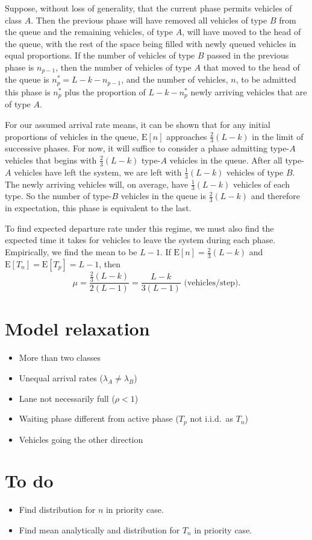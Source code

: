 \documentclass{amsart}
\begin{document}
Suppose, without loss of generality, that the current phase permits vehicles of
class $A$. Then the previous phase will have removed all vehicles of type $B$
from the queue and the remaining vehicles, of type $A$, will have moved to the
head of the queue, with the rest of the space being filled with newly queued
vehicles in equal proportions.
If the number of vehicles of type $B$ passed in the previous phase is $n_{p-1}$, then the number
of vehicles of type $A$ that moved to the head of the queue is
$n_p^*=L-k-n_{p-1}$,
and the number of vehicles, $n$, to be admitted this phase is $n_p^*$ plus the
proportion of $L -k-n_p^*$ newly arriving vehicles that are of type $A$.

For our assumed arrival rate means, it can be shown that for any initial
proportions of vehicles in the queue, $\text{E}[n]$ approaches
$\frac{2}{3}(L-k)$ in the limit of successive phases.
For now, it will suffice to consider a phase admitting type-$A$ vehicles that begins with
$\frac{2}{3}(L-k)$ type-$A$ vehicles in the queue.
After all type-$A$ vehicles have left the system, we are left with $\frac{1}{3}(L-k)$
vehicles of type $B$.
The newly arriving vehicles will, on average, have $\frac{1}{3}(L-k)$ vehicles of each type.
So the number of type-$B$ vehicles in the queue is $\frac{2}{3}(L-k)$ and
therefore in expectation, this phase is
equivalent to the last.

To find expected departure rate under this regime, we must also find the expected time it takes
for vehicles to leave the system during each phase.
Empirically, we find the mean to be $L-1$.
If $\text{E}[n] = \frac{2}{3}(L-k)$ and $\text{E}[T_n]=\text{E}[T_p]=L-1$, then
\begin{equation}
  \mu = \frac{\frac{2}{3}(L-k)}{2(L-1)}
  =\frac{L-k}{3(L-1)} \text{ (vehicles/step)}.
\end{equation}
\section{Model relaxation}
\begin{itemize}
\item More than two classes
\item Unequal arrival rates ($\lambda_A\neq\lambda_B$)
\item Lane not necessarily full ($\rho<1$)
\item Waiting phase different from active phase ($T_p$ not i.i.d.\ as  $T_n$)
\item Vehicles going the other direction
\end{itemize}
\section{To do}
\begin{itemize}
\item Find distribution for $n$ in priority case.
\item Find mean analytically and distribution for $T_n$ in priority case.
\end{itemize}



\end{document}
